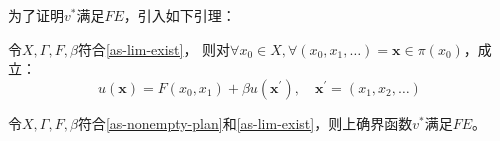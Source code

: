 为了证明$v^*$满足$FE$，引入如下引理：
\begin{lemma}
    令$X, \Gamma, F, \beta$符合\cref{as-lim-exist}，
    则对$\forall x_0 \in X, \forall \left(x_0,x_1,\dots\right)=\boldsymbol{x}\in\pi\left(x_0\right)$，成立：
    \begin{equation*}
        u\left(\boldsymbol{x}\right)=
            F\left(x_0,x_1\right)+\beta u\left(\boldsymbol{x}^{\prime}\right), \quad \boldsymbol{x}^{\prime}
                =\left(x_1,x_2,\dots\right)
    \end{equation*}
\end{lemma}
\begin{theorem}[SP-FE] \label{th-solution-sp-fe}
    令$X, \Gamma, F, \beta$符合\cref{as-nonempty-plan}和\cref{as-lim-exist}，则上确界函数$v^*$满足$FE$。
\end{theorem}
